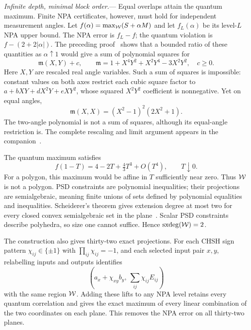\documentclass[aps,prl,reprint,superscriptaddress,nofootinbib,longbibliography]{revtex4-2}
\newcommand{\sxdeg}{\operatorname{sxdeg}}
\begin{document}
\emph{Infinite depth, minimal block order.}---
Equal overlaps attain the quantum maximum. Finite NPA certificates,
however, must hold for independent measurement angles. Let
$f(\alpha)=\max_{\mathcal W}(S+\alpha M)$ and let $f_L(\alpha)$ be its
level-$L$ NPA upper bound. The NPA error is $f_L-f$; the quantum
violation is $f-(2+2|\alpha|)$. The preceding proof~\cite{prior}
shows that a bounded ratio of these quantities as $\alpha\uparrow1$
would give a sum of polynomial squares for
\[
 \mathfrak m(X,Y)+c,\qquad
 \mathfrak m=1+X^4Y^2+X^2Y^4-3X^2Y^2,\quad c\ge0.
\]
Here $X,Y$ are rescaled real angle variables. Such a sum of squares is impossible:
constant values on both axes restrict each
cubic square factor to $a+bXY+dX^2Y+eXY^2$, whose squared
$X^2Y^2$ coefficient is nonnegative. Yet on equal angles,
\[
 \mathfrak m(X,X)=(X^2-1)^2(2X^2+1).
\]
The two-angle polynomial is not a sum of squares, although its
equal-angle restriction is. The complete rescaling and limit argument
appears in the companion~\cite{SM}.

The quantum maximum satisfies~\cite{GigenaEtAl2025,prior}
\[
 f(1-T)=4-2T+\tfrac43T^3+O(T^4),\qquad T\downarrow0.
\]
For a polygon, this maximum would be affine in $T$ sufficiently near
zero. Thus $\mathcal W$ is not a polygon. PSD constraints are polynomial
inequalities; their projections are semialgebraic, meaning finite
unions of sets defined by polynomial equalities and inequalities.
Scheiderer's theorem gives extension degree at most two for every
closed convex semialgebraic set in the plane~\cite{Scheiderer}.
Scalar PSD constraints describe polyhedra, so size one cannot suffice.
Hence $\sxdeg(\W)=2$.

The construction also gives thirty-two exact projections.
For each CHSH sign pattern $\chi_{ij}\in\{\pm1\}$ with
$\prod_{ij}\chi_{ij}=-1$,
and each selected input pair $x,y$, relabelling inputs and outputs identifies
\[
 \left(a_x+\chi_{xy}b_y,\ \sum_{ij}\chi_{ij}E_{ij}\right)
\]
with the same region $\mathcal W$.
Adding these lifts to any NPA level retains every quantum correlation
and gives the exact maximum of every linear combination of the two
coordinates on each plane. This removes the NPA error on all
thirty-two planes.
\end{document}
